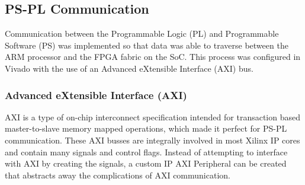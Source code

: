 \subsection{PS-PL Communication} \label{ssec:ps_pl}
Communication between the Programmable Logic (PL) and Programmable Software (PS) was implemented so that data was able to traverse between the ARM processor and the FPGA fabric on the SoC. This process was configured in Vivado with the use of an Advanced eXtensible Interface (AXI) bus.

\subsubsection{Advanced eXtensible Interface (AXI)}
AXI is a type of on-chip interconnect specification intended for transaction based master-to-slave memory mapped operations, which made it perfect for PS-PL communication. These AXI busses are integrally involved in most Xilinx IP cores and contain many signals and control flags. Instead of attempting to interface with AXI by creating the signals, a custom IP AXI Peripheral can be created that abstracts away the complications of AXI communication.

